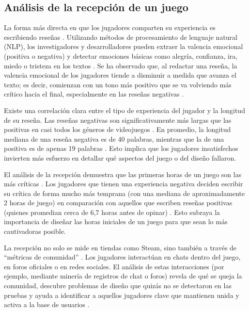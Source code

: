 \subsection{Análisis de la recepción de un juego}\label{subsec:analisis_recepcion}

La forma más directa en que los jugadores comparten su experiencia es escribiendo reseñas \parencite{GuzsvineczSzucs2023}. Utilizando métodos de procesamiento de lenguaje natural (NLP), los investigadores y desarrolladores pueden extraer la valencia emocional (positiva o negativa) y detectar emociones básicas como alegría, confianza, ira, miedo o tristeza en los textos \parencite{GuzsvineczSzucs2023}. Se ha observado que, al redactar una reseña, la valencia emocional de los jugadores tiende a disminuir a medida que avanza el texto; es decir, comienzan con un tono más positivo que se va volviendo más crítico hacia el final, especialmente en las reseñas negativas \parencite{GuzsvineczSzucs2023}.

Existe una correlación clara entre el tipo de experiencia del jugador y la longitud de su reseña. Las reseñas negativas son significativamente más largas que las positivas en casi todos los géneros de videojuegos \parencite{GuzsvineczSzucs2023}. En promedio, la longitud mediana de una reseña negativa es de 40 palabras, mientras que la de una positiva es de apenas 19 palabras \parencite{GuzsvineczSzucs2023}. Esto implica que los jugadores insatisfechos invierten más esfuerzo en detallar qué aspectos del juego o del diseño fallaron.

El análisis de la recepción demuestra que las primeras horas de un juego son las más críticas \parencite{GuzsvineczSzucs2023}. Los jugadores que tienen una experiencia negativa deciden escribir su crítica de forma mucho más temprana (con una mediana de aproximadamente 2 horas de juego) en comparación con aquellos que escriben reseñas positivas (quienes promedian cerca de 6,7 horas antes de opinar) \parencite{GuzsvineczSzucs2023}. Esto subraya la importancia de diseñar las horas iniciales de un juego para que sean lo más cautivadoras posible.

La recepción no solo se mide en tiendas como Steam, sino también a través de \enquote{métricas de comunidad} \parencite{DrachenEtAl2011}. Los jugadores interactúan en chats dentro del juego, en foros oficiales o en redes sociales. El análisis de estas interacciones (por ejemplo, mediante minería de registros de chat o foros) revela de qué se queja la comunidad, descubre problemas de diseño que quizás no se detectaron en las pruebas y ayuda a identificar a aquellos jugadores clave que mantienen unida y activa a la base de usuarios \parencite{DrachenEtAl2011}.

